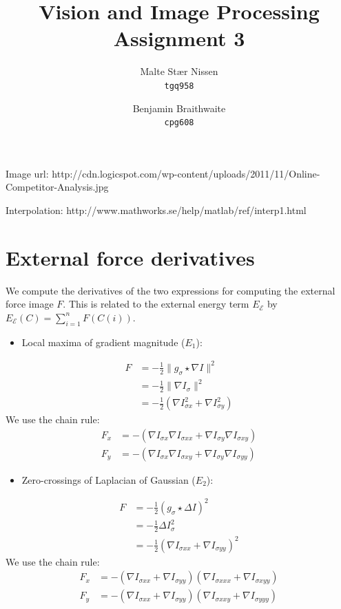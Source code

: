 \documentclass[11pt,a4paper]{article}
\title{Vision and Image Processing\\Assignment 3}
\author{Malte Stær Nissen \\ \texttt{tgq958} \and Benjamin Braithwaite \\
\texttt{cpg608}}
\begin{document}
\maketitle

Image url: http://cdn.logicspot.com/wp-content/uploads/2011/11/Online-Competitor-Analysis.jpg

Interpolation: http://www.mathworks.se/help/matlab/ref/interp1.html

\section{External force derivatives}
%
We compute the derivatives of the two expressions for computing the external force image $F$. This is related to the external energy term $E_\mathcal{E}$ by $E_\mathcal{E}(C) = \sum_{i=1}^n F(C(i))$.
\begin{itemize}
\item Local maxima of gradient magnitude ($E_1$):
\end{itemize}
%
\begin{align}
F &= - \frac12 \| g_\sigma \star \nabla I \|^2 \\
&= - \frac12 \| \nabla I_{\sigma} \|^2 \\
&= - \frac12 (\nabla I_{\sigma x}^2 + \nabla I_{\sigma y}^2)
\end{align}
%
We use the chain rule:
%
\begin{align}
F_x &= - (\nabla I_{\sigma x} \nabla I_{\sigma xx} + \nabla I_{\sigma y} \nabla I_{\sigma xy}) \\
F_y &= - (\nabla I_{\sigma x} \nabla I_{\sigma xy} + \nabla I_{\sigma y} \nabla I_{\sigma yy})
\end{align}
%
\begin{itemize}
\item Zero-crossings of Laplacian of Gaussian ($E_2$):
\end{itemize}
%
\begin{align}
F &= - \frac12 ( g_\sigma \star \Delta I)^2 \\
&= - \frac12 \Delta I_{\sigma}^2 \\
&= - \frac12 (\nabla I_{\sigma xx} + \nabla I_{\sigma yy})^2
\end{align}
%
We use the chain rule:
%
\begin{align}
F_x &= - (\nabla I_{\sigma xx} + \nabla I_{\sigma yy}) (\nabla I_{\sigma xxx} + \nabla I_{\sigma xyy}) \\
F_y &= - (\nabla I_{\sigma xx} + \nabla I_{\sigma yy}) (\nabla I_{\sigma xxy} + \nabla I_{\sigma yyy})
\end{align}
%
\end{document}
